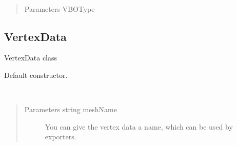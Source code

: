 \documentclass[letterpaper,10pt,english]{sphinxmanual}
\begin{document}

\begin{fulllineitems}
\label{gl:VBO::hasType__VBOType}~\begin{quote}\begin{description}
\item[{Parameters VBOType}] \leavevmode


\end{description}\end{quote}

\end{fulllineitems}



\subsection{VertexData}
\label{gl:vertexdata}

\begin{fulllineitems}
\label{gl:VertexData}
VertexData class

\end{fulllineitems}


\begin{fulllineitems}
\label{gl:VertexData::VertexData}
Default constructor.

\end{fulllineitems}


\begin{fulllineitems}
\label{gl:VertexData::VertexData__string}~\begin{quote}\begin{description}
\item[{Parameters string meshName}] \leavevmode
You can give the vertex data a name, which can be
used by exporters.

\end{description}\end{quote}

\end{fulllineitems}
\end{document}
